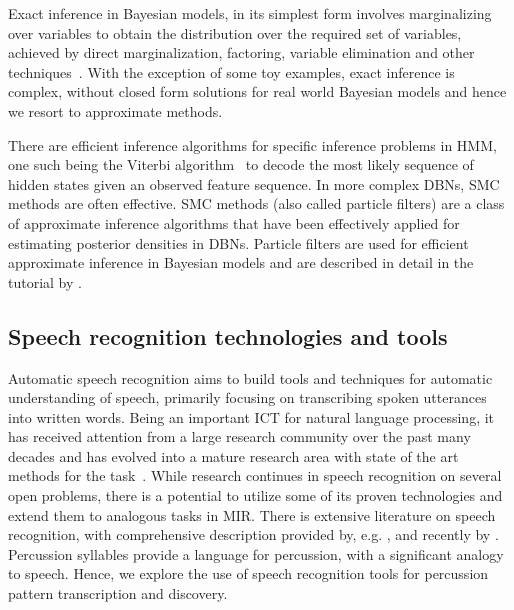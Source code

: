Exact inference in Bayesian models, in its simplest form involves marginalizing over variables to obtain the distribution over the required set of variables, achieved by direct marginalization, factoring, variable elimination and other techniques~\cite{ambrosio:99:bninf}. With the exception of some toy examples, exact inference is complex, without closed form solutions for real world Bayesian models and hence we resort to approximate methods. 

There are efficient inference algorithms for specific inference problems in \gls{HMM}, one such being the Viterbi algorithm~\cite{rabiner:89:tutorial} to decode the most likely sequence of hidden states given an observed feature sequence. In more complex \glspl{DBN}, \gls{SMC} methods are often effective. \gls{SMC} methods (also called particle filters) are a class of approximate inference algorithms that have been effectively applied for estimating posterior densities in \glspl{DBN}. Particle filters are used for efficient approximate inference in Bayesian models and are described in detail in the tutorial by . %
\subsection{Speech recognition technologies and tools}
Automatic speech recognition aims to build tools and techniques for automatic understanding of speech, primarily focusing on transcribing spoken utterances into written words. Being an important \gls{ICT} for natural language processing, it has received attention from a large research community over the past many decades and has evolved into a mature research area with state of the art methods for the task~\cite{huang:10:sroverview}. While research continues in speech recognition on several open problems, there is a potential to utilize some of its proven technologies and extend them to analogous tasks in \gls{MIR}. There is extensive literature on speech recognition, with comprehensive description provided by, e.g. ,  and recently by . Percussion syllables provide a language for percussion, with a significant analogy to speech. Hence, we explore the use of speech recognition tools for percussion pattern transcription and discovery. 

